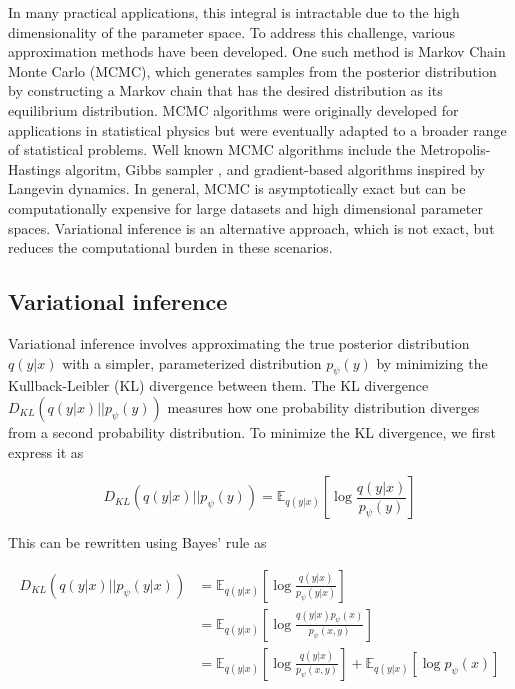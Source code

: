In many practical applications, this integral is intractable due to the high dimensionality of the parameter space. To address this challenge, various approximation methods have been developed. One such method is Markov Chain Monte Carlo (MCMC), which generates samples from the posterior distribution by constructing a Markov chain that has the desired distribution as its equilibrium distribution. MCMC algorithms were originally developed for applications in statistical physics but were eventually adapted to a broader range of statistical problems. Well known MCMC algorithms include the Metropolis-Hastings algoritm, Gibbs sampler \parencite{Geman1984}, and gradient-based algorithms inspired by Langevin dynamics. In general, MCMC is asymptotically exact but can be computationally expensive for large datasets and high dimensional parameter spaces. Variational inference is an alternative approach, which is not exact, but reduces the computational burden in these scenarios.

\subsection{Variational inference}

Variational inference involves approximating the true posterior distribution \( q(y \lvert x) \) with a simpler, parameterized distribution \( p_{\psi}(y) \) by minimizing the Kullback-Leibler (KL) divergence between them. The KL divergence \( D_{KL}(q(y \lvert x) \lvert\lvert p_{\psi}(y)) \) measures how one probability distribution diverges from a second probability distribution. To minimize the KL divergence, we first express it as

\begin{equation*}
D_{KL}(q(y \lvert x) \lvert\lvert p_{\psi}(y)) = \mathbb{E}_{q(y \lvert x)}\left[\log \frac{q(y \lvert x)}{p_{\psi}(y)}\right]
\end{equation*}

This can be rewritten using Bayes' rule as

\begin{align*}
D_{KL}(q(y \lvert x) \lvert\lvert p_{\psi}(y\lvert x)) &= \mathbb{E}_{q(y \lvert x)}\left[\log \frac{q(y \lvert x)}{p_{\psi}(y\lvert x)}\right] \\
&= \mathbb{E}_{q(y \lvert x)}\left[\log \frac{q(y\lvert x)p_{\psi}(x)}{p_{\psi}(x,y)} \right]\\
&= \mathbb{E}_{q(y \lvert x)}\left[\log \frac{q(y\lvert x)}{p_{\psi}(x,y)} \right] + \mathbb{E}_{q(y \lvert x)}\left[\log p_{\psi}(x) \right]
\end{align*}

